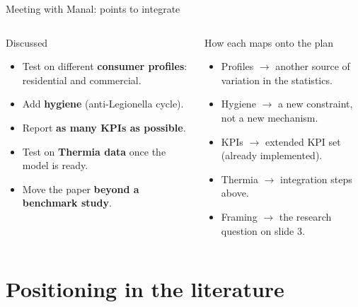 \documentclass[aspectratio=169,10pt]{beamer}
\begin{document}
\begin{frame}{Meeting with Manal: points to integrate}
\begin{columns}[T]
\begin{block}{Discussed}
\begin{itemize}
  \item Test on different \textbf{consumer profiles}: residential and commercial.
  \item Add \textbf{hygiene} (anti-Legionella cycle).
  \item Report \textbf{as many KPIs as possible}.
  \item Test on \textbf{Thermia data} once the model is ready.
  \item Move the paper \textbf{beyond a benchmark study}.
\end{itemize}
\end{block}
\begin{block}{How each maps onto the plan}
\begin{itemize}
  \item Profiles $\rightarrow$ another source of variation in the statistics.
  \item Hygiene $\rightarrow$ a new constraint, not a new mechanism.
  \item KPIs $\rightarrow$ extended KPI set (already implemented).
  \item Thermia $\rightarrow$ integration steps above.
  \item Framing $\rightarrow$ the research question on slide 3.
\end{itemize}
\end{block}
\end{columns}
\end{frame}

\section{Positioning in the literature}
\end{document}
